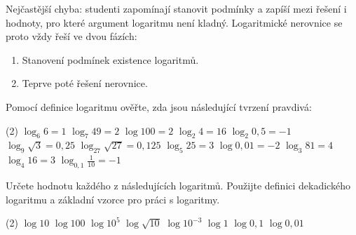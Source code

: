 \documentclass[12pt,a4paper]{article}
\begin{document}
\begin{notebox}
Nejčastější chyba: studenti zapomínají stanovit podmínky a zapíší mezi řešení i
hodnoty, pro které argument logaritmu není kladný. Logaritmické nerovnice se
proto vždy řeší ve dvou fázích:

\begin{enumerate}[label=\arabic*.]
\item Stanovení podmínek existence logaritmů.
\item Teprve poté řešení nerovnice.
\end{enumerate}

\end{notebox}




\exercisepart
\setcounter{section}{1}

\begin{exercise}
    Pomocí definice logaritmu ověřte, zda jsou následující tvrzení pravdivá:
    \begin{tasks}(2)
        \task $\log_6 6 = 1$
        \task $\log_7 49 = 2$
        \task $\log 100 = 2$
        \task $\log_2 4 = 16$
        \task $\log_2 0{,}5 = -1$
        \task $\log_9 \sqrt{3} = 0{,}25$
        \task $\log_{27} \sqrt{27} = 0{,}125$
        \task $\log_5 25 = 3$
        \task $\log 0{,}01 = -2$
        \task $\log_3 81 = 4$
        \task $\log_4 16 = 3$
        \task $\log_{0{,}1} \frac{1}{10} = -1$
    \end{tasks}
\end{exercise}


\begin{exercise}
    Určete hodnotu každého z následujících logaritmů. Použijte definici dekadického logaritmu
    a základní vzorce pro práci s logaritmy.
    \begin{tasks}(2)
        \task $\log 10$
        \task $\log 100$
        \task $\log 10^{5}$
        \task $\log \sqrt{10}$
        \task $\log 10^{-3}$
        \task $\log 1$
        \task $\log 0{,}1$
        \task $\log 0{,}01$
    \end{tasks}
\end{exercise}
\end{document}
